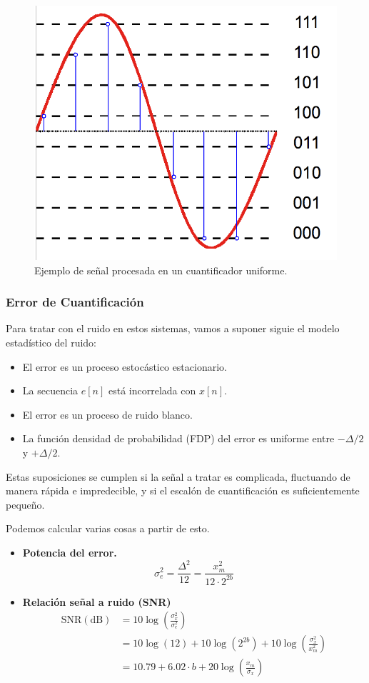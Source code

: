 \documentclass[a4paper,oneside]{book}
\begin{document}
\begin{figure}[htp]
	\centering
	\caption{Ejemplo de señal procesada en un cuantificador uniforme.}\label{fig:cuantificadorUniforme}
	\includegraphics[width=0.6\linewidth]{Imágenes/Quantification.png}
\end{figure}

\subsubsection{Error de Cuantificación}

Para tratar con el ruido en estos sistemas, vamos a suponer siguie el modelo estadístico del ruido:
\begin{itemize}
	\item El error es un proceso estocástico estacionario.
	\item La secuencia $e[n]$ está incorrelada con $x[n]$.
	\item El error es un proceso de ruido blanco.
	\item La función densidad de probabilidad (FDP) del error es uniforme entre $-\Delta / 2$ y $+\Delta / 2$.
\end{itemize}

Estas suposiciones se cumplen si la señal a tratar es complicada, fluctuando de manera rápida e impredecible, y  si el escalón de cuantificación es suficientemente pequeño.

Podemos calcular varias cosas a partir de esto.
\begin{itemize}
	\item \textbf{Potencia del error.} \[ \sigma_e^2 = \frac{\Delta ^2}{12} = \frac{x_m^2}{12 \cdot 2^{2b}} \]
	\item \textbf{Relación señal a ruido (SNR)}
	\begin{align*}
		\textrm{SNR}(\unit{\dB}) &= 10 \log \left( \frac{\sigma_x^2}{\sigma_e^2} \right) \\ 
		&= 10 \log \left( 12 \right) + 10 \log \left( 2^{2b} \right) + 10 \log \left( \frac{\sigma_x^2}{x_m^2} \right) \\
		&= \boxed{10.79} + \boxed{6.02 \cdot b} + \boxed{20 \log \left( \frac{x_m}{\sigma_x} \right) }
	\end{align*}
\end{itemize}
\end{document}
